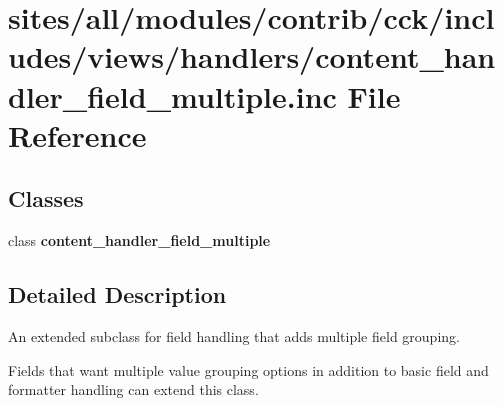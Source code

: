 \hypertarget{content__handler__field__multiple_8inc}{
\section{sites/all/modules/contrib/cck/includes/views/handlers/content\_\-handler\_\-field\_\-multiple.inc File Reference}
\label{content__handler__field__multiple_8inc}
}
\subsection*{Classes}
\begin{CompactItemize}
\item 
class \textbf{content\_\-handler\_\-field\_\-multiple}
\end{CompactItemize}


\subsection{Detailed Description}
An extended subclass for field handling that adds multiple field grouping.

Fields that want multiple value grouping options in addition to basic field and formatter handling can extend this class. 
